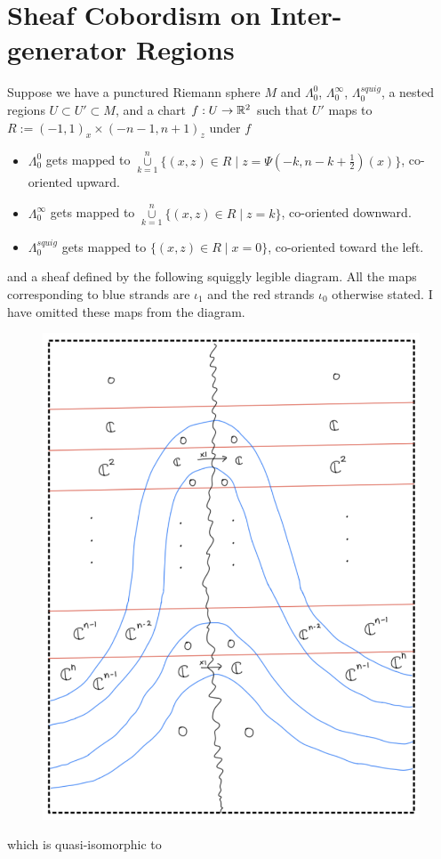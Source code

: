 \section{Sheaf Cobordism on Inter-generator Regions}
Suppose we have a punctured Riemann sphere $M$ and $\Lambda_0^0$, $\Lambda_0^\infty$, $\Lambda_0^{squig}$, a nested regions $U\subset U' \subset M$, and a chart $f : U \rightarrow \mathbb{R}^2$ such that $U'$ maps to $R:=(-1,1)_x \times (-n-1,n+1)_z$ under $f$
\begin{itemize}
\item $\Lambda_0^0$ gets mapped to $\overset{n}{\underset{k=1}{\cup}}\{(x,z)\in R \mid z=\Psi(-k,n-k+\frac{1}{2})(x)\}$, co-oriented upward.

\item $\Lambda_0^\infty$ gets mapped to $\overset{n}{\underset{k=1}{\cup}}\{(x,z)\in R \mid z=k\}$, co-oriented downward.

\item $\Lambda_0^{squig}$ gets mapped to $\{(x,z)\in R \mid x=0\}$, co-oriented toward the left.
\end{itemize}
and a sheaf defined by the following squiggly legible diagram. All the maps corresponding to blue strands are $\iota_1$ and the red strands $\iota_0$ otherwise stated. I have omitted these maps from the diagram.\\

\begin{figure}[H]
    \centering
    \includegraphics[scale = 0.95]{diagrams/cobord_inter/0.png}
    \caption{}
    \label{fig:your-label}
\end{figure}
\pagebreak
which is quasi-isomorphic to

